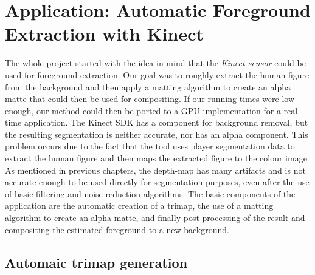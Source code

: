 \chapter{Application: Automatic Foreground Extraction with Kinect}
\label{chap:application}


The whole project started with the idea in mind that the \textit{Kinect sensor} could be used for foreground extraction. Our goal was to roughly extract the human figure from the background and then apply a matting algorithm to create an alpha matte that could then be used for compositing. If our running times were low enough, our method could then be ported to a GPU implementation for a real time application. The Kinect SDK has a component for background removal, but the resulting segmentation is neither accurate, nor has an alpha component. This problem occurs due to the fact that the tool uses player segmentation data to extract the human figure and then maps the extracted figure to the colour image. As mentioned in previous chapters, the depth-map has many artifacts and is not accurate enough to be used directly for segmentation purposes, even after the use of basic filtering and noise reduction algorithms. The basic components of the application are the automatic creation of a trimap, the use of a matting algorithm to create an alpha matte, and finally post processing of the result and compositing the estimated foreground to a new background.

\section{Automaic trimap generation}
\label{sec:automatic-trimap-generation}

